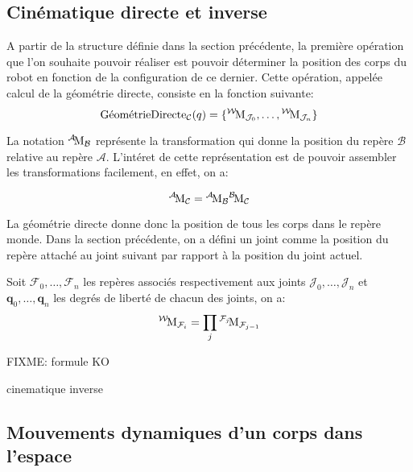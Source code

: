 \subsection{Cinématique directe et inverse}

A partir de la structure définie dans la section précédente, la
première opération que l'on souhaite pouvoir réaliser est pouvoir
déterminer la position des corps du robot en fonction de la
configuration de ce dernier. Cette opération, appelée calcul de la géométrie directe, consiste en la fonction suivante:
\begin{equation}
  \text{GéométrieDirecte}_{\mathcal{C}}(q) = \{
  {}^{\mathcal{W}}\!\text{M}_{\mathcal{J}_0}, \dotsc,
  {}^{\mathcal{W}}\!\text{M}_{\mathcal{J}_n} \}
\end{equation}

La notation ${}^{\mathcal{A}}\!\text{M}_{\mathcal{B}}$ représente la
transformation qui donne la position du repère $\mathcal{B}$ relative
au repère $\mathcal{A}$. L'intéret de cette représentation est de pouvoir assembler les transformations facilement, en effet, on a:

\begin{equation}
  {}^{\mathcal{A}}\!\text{M}_{\mathcal{C}} = {}^{\mathcal{A}}\!\text{M}_{\mathcal{B}} {}^{\mathcal{B}}\!\text{M}_{\mathcal{C}}
\end{equation}


La géométrie directe donne donc la position de tous les corps dans le
repère monde. Dans la section précédente, on a défini un joint comme
la position du repère attaché au joint suivant par rapport à la
position du joint actuel.

\begin{mydef}
Soit $\mathcal{F}_0, \dotsc, \mathcal{F}_n$ les repères associés
respectivement aux joints $\mathcal{J}_0, \dotsc, \mathcal{J}_n$ et
$\mathbf{q}_0, \dotsc, \mathbf{q}_n$ les degrés de liberté de chacun
des joints, on a:
\begin{equation}
  {}^{\mathcal{W}}\!\text{M}_{\mathcal{F}_i} = \prod_{j} {}^{\mathcal{F}_j}\!\text{M}_{\mathcal{F}_{j-1}}
\end{equation}
\end{mydef}
FIXME: formule KO


cinematique inverse


\subsection{Mouvements dynamiques d'un corps dans l'espace}

